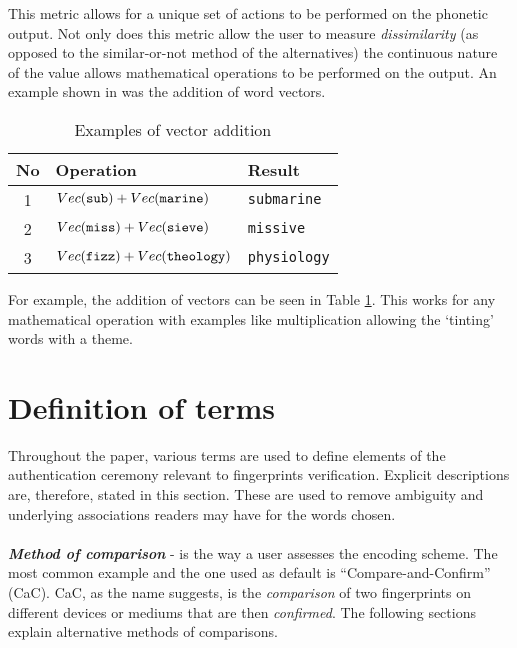 This metric allows for a unique set of actions to be performed on the phonetic output. Not only does this metric allow the user to measure \textit{dissimilarity} (as opposed to the similar-or-not method of the alternatives) the continuous nature of the value allows mathematical operations to be performed on the output. An example shown in \cite{parrish2017poetic} was the addition of word vectors.

\begin{table}[!htb]
    \centering
    \begin{tabular}{cll}
        No & Operation & Result \\
        \hline
        1  & $Vec(\verb|sub|) + Vec(\verb|marine|)$ & \verb|submarine| \\
        2  & $Vec(\verb|miss|) + Vec(\verb|sieve|)$ & \verb|missive| \\
        3  & $Vec(\verb|fizz|) + Vec(\verb|theology|)$ & \verb|physiology| \\
    \end{tabular}
    \caption{Examples of vector addition}
    \label{tab:vectorAdd}
\end{table}

For example, the addition of vectors can be seen in Table \ref{tab:vectorAdd}. This works for any mathematical operation with examples like multiplication allowing the `tinting' words with a theme.

\section{Definition of terms}
Throughout the paper, various terms are used to define elements of the authentication ceremony relevant to fingerprints verification. Explicit descriptions are, therefore, stated in this section. These are used to remove ambiguity and underlying associations readers may have for the words chosen.
\\\\
\textbf{\textit{Method of comparison}} - is the way a user assesses the encoding scheme. The most common example and the one used as default is ``Compare-and-Confirm'' (CaC). CaC, as the name suggests, is the \textit{comparison} of two fingerprints on different devices or mediums that are then \textit{confirmed}. The following sections explain alternative methods of comparisons.


